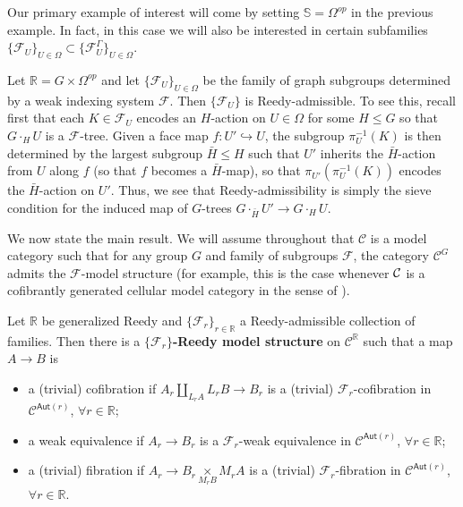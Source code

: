 \documentclass[a4paper,10pt
,draft
]{article}%
\begin{document}
Our primary example of interest will come by setting
$\mathbb{S} = \Omega^{op}$ in the previous example.
In fact, in this case we will also be interested 
in certain subfamilies
$\{\mathcal{F}_U\}_{U \in \Omega}
\subset \{\mathcal{F}_U^{\Gamma}\}_{U \in \Omega}$.

\begin{example}\label{FGRAPHREEDY EX}
	Let $\mathbb{R} = G \times \Omega^{op}$ and let
	$\{\mathcal{F}_U\}_{U \in \Omega}$ be the family of graph subgroups determined by a weak indexing system $\mathcal{F}$.
	Then $\{\mathcal{F}_U\}$ is Reedy-admissible.
	To see this, recall first that each $K \in \mathcal{F}_U$ encodes 
	an $H$-action on $U \in \Omega$ for some $H \leq G$
	so that $G \cdot_H U$ is a $\mathcal{F}$-tree.
	Given a face map $f \colon U' \hookrightarrow U$, 
	the subgroup $\pi^{-1}_U(K)$ is then determined by the largest subgroup $\bar{H}\leq H$ such that 
	$U'$ inherits the $\bar{H}$-action from $U$ along $f$ (so that $f$ becomes a $\bar{H}$-map), 
	so that $\pi_{U'}(\pi^{-1}_U(K))$ encodes the $\bar{H}$-action on $U'$. Thus, we see that Reedy-admissibility is simply the sieve condition for the induced map of $G$-trees
	$G \cdot_{\bar{H}} U' \to G \cdot_H U$.
\end{example}

We now state the main result.
We will assume throughout that $\mathcal{C}$ is a model category such that for any group $G$ and family of subgroups $\mathcal{F}$,
the category $\mathcal{C}^G$ admits the
$\mathcal{F}$-model structure
(for example, this is the case whenever $\mathcal{C}$ is a cofibrantly generated cellular model category in the sense of \cite{Ste16}).


\begin{theorem}\label{REEDYADM THM}
Let $\mathbb{R}$ be generalized Reedy and 
$\{\mathcal{F}_r\}_{r \in \mathbb{R}}$ a Reedy-admissible collection of families. 
Then there is a \textbf{$\{\mathcal{F}_r\}$-Reedy model structure} on
$\mathcal{C}^{\mathbb{R}}$ such that a map $A \to B$ is
\begin{itemize}
  \item a (trivial) cofibration if $A_r \underset{L_r A}{\amalg}L_r B \to B_r$ is a (trivial) $\mathcal{F}_r$-cofibration in $\mathcal{C}^{\mathsf{Aut}(r)}$, $\forall r \in \mathbb{R}$;
	\item a weak equivalence if $A_r \to B_r$ is a $\mathcal{F}_r$-weak equivalence in $\mathcal{C}^{\mathsf{Aut}(r)}$, $\forall r \in \mathbb{R}$;
	\item a (trivial) fibration if $A_r \to B_r \underset{M_r B}{\times }M_r A $ is a (trivial) $\mathcal{F}_r$-fibration in $\mathcal{C}^{\mathsf{Aut}(r)}$, $\forall r \in \mathbb{R}$.
\end{itemize}
\end{theorem}
\end{document}
